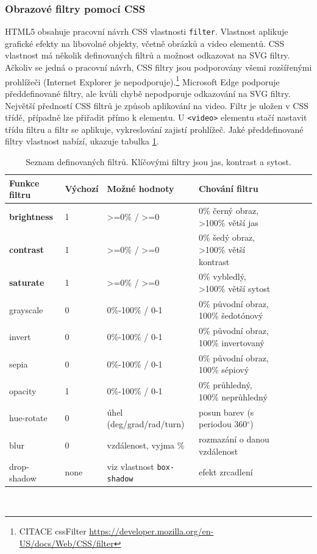\subsubsection{Obrazové filtry pomocí CSS}
HTML5 obsahuje pracovní návrh CSS vlastnosti \texttt{filter}. Vlastnost aplikuje grafické efekty na libovolné objekty, včetně obrázků a video elementů. CSS vlastnost má několik definovaných filtrů a možnost odkazovat na SVG filtry. Ačkoliv se jedná o pracovní návrh, CSS filtry jsou podporovány všemi rozšířenými prohlížeči (Internet Explorer je nepodporuje).\footnote{CITACE cssFilter \url{https://developer.mozilla.org/en-US/docs/Web/CSS/filter}} Microsoft Edge podporuje předdefinované filtry, ale kvůli chybě nepodporuje odkazování na SVG filtry. Největší předností CSS filtrů je způsob aplikování na video. Filtr je uložen v CSS třídě, případně lze přiřadit přímo k elementu. U \texttt{<video>} elementu stačí nastavit třídu filtru a filtr se aplikuje, vykreslování zajistí prohlížeč. Jaké předdefinované filtry vlastnost  nabízí, ukazuje tabulka \ref{tab:filters}.
\begin{table}[h]
    \centering
    \begin{tabular}{|l|l|l|l|l|l|l|l|}
    \hline
    Funkce filtru   & Výchozí & Možné hodnoty & Chování filtru \\
    \hline
    \textbf{brightness}  & 1 & >=0\% / >=0 & 0\% černý obraz, >100\% větší jas \\
    \textbf{contrast}    & 1 & >=0\% / >=0 & 0\% šedý obraz, >100\% větší kontrast\\
    \textbf{saturate}    & 1 & >=0\% / >=0 & 0\% vybledlý, >100\% větší sytost\\
    grayscale   & 0 & 0\%-100\% / 0-1 & 0\% původní obraz, 100\% šedotónový\\
    invert      & 0 & 0\%-100\% / 0-1 & 0\% původní obraz, 100\% invertovaný\\
    sepia       & 0 & 0\%-100\% / 0-1 & 0\% původní obraz, 100\% sépiový\\
    opacity     & 1 & 0\%-100\% / 0-1 & 0\% průhledný, 100\% neprůhledný\\
    hue-rotate  & 0 & úhel (deg/grad/rad/turn) & posun barev (s periodou 360$^{\circ}$)\\
    blur        & 0 & vzdálenost, vyjma \% & rozmazání o danou vzdálenost \\
    drop-shadow & none & viz vlastnost \texttt{box-shadow} & efekt zrcadlení\\
    \hline
    \end{tabular}
    \caption{Seznam definovaných filtrů. Klíčovými filtry jsou jas, kontrast a sytost.}
    \label{tab:filters}
\end{table}\\

